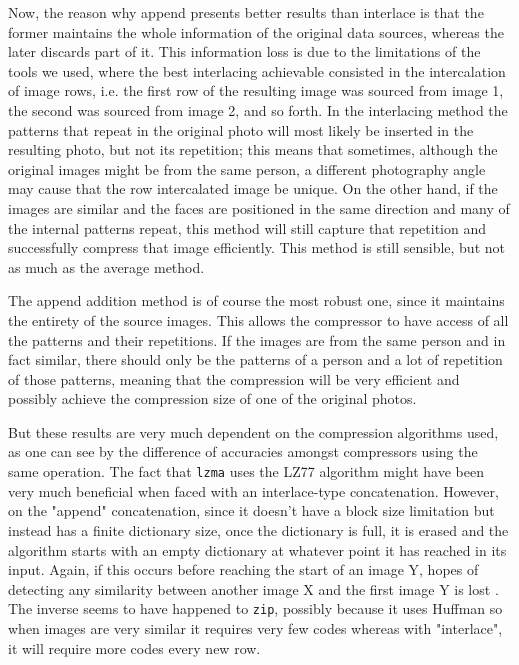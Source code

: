 \documentclass[12pt]{article}
\begin{document}
Now, the reason why append presents better results than interlace is that the former maintains the whole information of the original data sources, whereas the 
later discards part of it.
This information loss is due to the limitations of the tools we used, where the best interlacing achievable consisted in the intercalation of image rows, 
i.e. the first row of the resulting image was sourced from image 1, the second was sourced from image 2, and so forth. 
In the interlacing method the patterns that repeat in the original photo will most likely be inserted in the resulting photo, but not its repetition;
this means that sometimes, although the original images might be from the same person, a different photography angle may cause that the row intercalated image be unique. 
On the other hand, if the images are similar and the faces are positioned in the same direction and many of the internal patterns repeat, this method will still 
capture that repetition and successfully compress that image efficiently. 
This method is still sensible, but not as much as the average method.

The append addition method is of course the most robust one, since it maintains the entirety of the source images. 
This allows the compressor to have access of all the patterns and their repetitions. 
If the images are from the same person and in fact similar, there should only be the patterns of a person and a lot of repetition of those patterns, meaning 
that the compression will be very efficient and possibly achieve the compression size of one of the original photos.

But these results are very much dependent on the compression algorithms used, as one can see by the difference of accuracies amongst compressors using the same 
operation. 
The fact that \texttt{lzma} uses the LZ77 algorithm might have been very much beneficial when faced with an interlace-type concatenation.
However, on the "append" concatenation, since it doesn’t have a block size limitation but instead has a finite dictionary size, once the dictionary is full, it 
is erased and the algorithm starts with an empty dictionary at whatever point it has reached in its input. 
Again, if this occurs before reaching the start of an image Y, hopes of detecting any similarity between another image X and the first image Y is lost \cite{lzmaExplanation}.
The inverse seems to have happened to \texttt{zip}, possibly because it uses Huffman so when images are very similar it requires very few codes whereas with 
"interlace", it will require more codes every new row.
\newline
\end{document}

